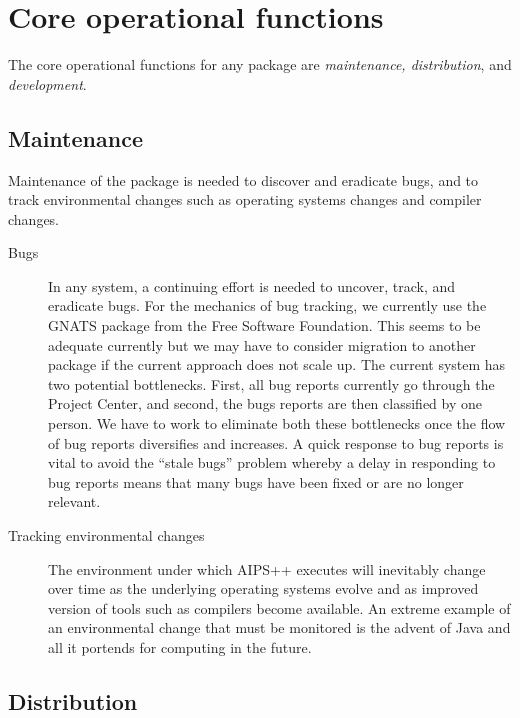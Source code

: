 \section{Core operational functions}

The core operational functions for any package are {\em maintenance,
distribution}, and {\em development}.

\subsection{Maintenance}

Maintenance of the package is needed to discover and eradicate bugs, and
to track environmental changes such as operating systems changes
and compiler changes.
\begin{description}
\item[Bugs] In any system, a continuing effort is needed to uncover,
track, and eradicate bugs. For the mechanics of bug tracking, we
currently use the GNATS package from the Free Software
Foundation. This seems to be adequate currently but we may have to
consider migration to another package if the current approach does not
scale up.  The current system has two potential bottlenecks. First,
all bug reports currently go through the Project Center, and second,
the bugs reports are then classified by one person. We have to work to
eliminate both these bottlenecks once the flow of bug reports
diversifies and increases. A quick response to bug reports is vital to
avoid the ``stale bugs'' problem whereby a delay in responding to bug
reports means that many bugs have been fixed or are no longer
relevant.
\item[Tracking environmental changes] The environment under which AIPS++
executes will inevitably change over time as the underlying operating
systems evolve and as improved version of tools such as compilers
become available. An extreme example of an environmental change
that must be monitored is the advent of Java and all it portends
for computing in the future.
\end{description}

\subsection{Distribution}

